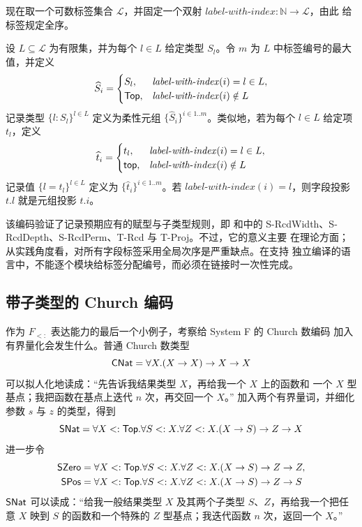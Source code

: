 现在取一个可数标签集合 \(\mathcal L\)，并固定一个双射
\(\mathit{label\mbox{-}with\mbox{-}index}:\mathbb N\to\mathcal L\)，由此
给标签规定全序。

\begin{definition}
\label{def:26.3.3}
设 \(L\subseteq\mathcal L\) 为有限集，并为每个 \(l\in L\) 给定类型
\(S_l\)。令 \(m\) 为 \(L\) 中标签编号的最大值，并定义
\[
\widehat S_i=
\begin{cases}
S_l,&\mathit{label\mbox{-}with\mbox{-}index}(i)=l\in L,\\
\mathsf{Top},&\mathit{label\mbox{-}with\mbox{-}index}(i)\notin L
\end{cases}
\]
记录类型 \(\{l:S_l\}^{l\in L}\) 定义为柔性元组
\(\{\widehat S_i\}^{i\in1..m}\)。类似地，若为每个 \(l\in L\) 给定项
\(t_l\)，定义
\[
\widehat t_i=
\begin{cases}
t_l,&\mathit{label\mbox{-}with\mbox{-}index}(i)=l\in L,\\
\mathsf{top},&\mathit{label\mbox{-}with\mbox{-}index}(i)\notin L
\end{cases}
\]
记录值 \(\{l=t_l\}^{l\in L}\) 定义为
\(\{\widehat t_i\}^{i\in1..m}\)。若
\(\mathit{label\mbox{-}with\mbox{-}index}(i)=l\)，则字段投影 \(t.l\)
就是元组投影 \(t.i\)。
\end{definition}

该编码验证了记录预期应有的赋型与子类型规则，即
和中的
S-RcdWidth、S-RcdDepth、S-RcdPerm、T-Rcd 与 T-Proj。不过，它的意义主要
在理论方面；从实践角度看，对所有字段标签采用全局次序是严重缺点。在支持
独立编译的语言中，不能逐个模块给标签分配编号，而必须在链接时一次性完成。

\subsection*{带子类型的 Church 编码}

作为 \(F_{<:}\) 表达能力的最后一个小例子，考察给 System F 的 Church 数编码
加入有界量化会发生什么。普通 Church 数类型
\[
\mathsf{CNat}=\forall X.(X\to X)\to X\to X
\]
可以拟人化地读成：“先告诉我结果类型 \(X\)，再给我一个 \(X\) 上的函数和
一个 \(X\) 型基点；我把函数在基点上迭代 \(n\) 次，再交回一个 \(X\)。”
加入两个有界量词，并细化参数 \(s\) 与 \(z\) 的类型，得到
\[
\mathsf{SNat}
=\forall X<:\mathsf{Top}.
 \forall S<:X.\forall Z<:X.(X\to S)\to Z\to X
\]
进一步令
\[
\begin{aligned}
\mathsf{SZero}
 &=\forall X<:\mathsf{Top}.
   \forall S<:X.\forall Z<:X.(X\to S)\to Z\to Z,\\
\mathsf{SPos}
 &=\forall X<:\mathsf{Top}.
   \forall S<:X.\forall Z<:X.(X\to S)\to Z\to S
\end{aligned}
\]
\(\mathsf{SNat}\) 可以读成：“给我一般结果类型 \(X\) 及其两个子类型
\(S\)、\(Z\)，再给我一个把任意 \(X\) 映到 \(S\) 的函数和一个特殊的
\(Z\) 型基点；我迭代函数 \(n\) 次，返回一个 \(X\)。”

